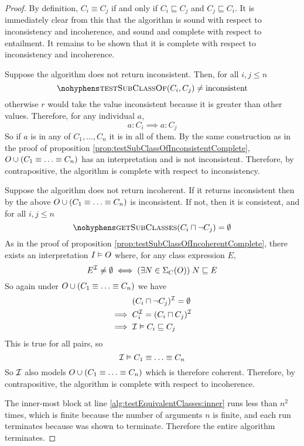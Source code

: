 \documentclass[paper.tex]{subfiles}
\begin{document}
\begin{proof}
  By definition, $C_i \equiv C_j$ if and only if $C_i \sqsubseteq C_j$ and $C_j \sqsubseteq C_i$.  It is immediately clear from this that the algorithm is sound with respect to inconsistency and incoherence, and sound and complete with respect to entailment.  It remains to be shown that it is complete with respect to inconsistency and incoherence.

  Suppose the algorithm does not return inconsistent.  Then, for all $i,j \le n$
  \[ \textproc{testSubClassOf}(C_i, C_j) \ne \mathrm{inconsistent} \]
  otherwise $r$ would take the value inconsistent because it is greater than other values.
  Therefore, for any individual $a$,
  \[ a : C_i \implies a : C_j \]
  So if $a$ is in any of $C_1, \ldots, C_n$ it is in all of them.  By the same construction as in the proof of proposition \ref{prop:testSubClassOfInconsistentComplete}, $O \cup (C_1 \equiv \ldots \equiv C_n)$ has an interpretation and is not inconsistent.  Therefore, by contrapositive, the algorithm is complete with respect to inconsistency.

  Suppose the algorithm does not return incoherent.  If it returns inconsistent then by the above $O \cup (C_1 \equiv \ldots \equiv C_n)$ is inconsistent.  If not, then it is consistent, and for all $i,j \le n$
  \[ \textproc{getSubClasses}(C_i \sqcap \neg C_j) = \emptyset \]
  As in the proof of proposition \ref{prop:testSubClassOfIncoherentComplete}, there exists an interpretation $I \vDash O$ where, for any class expression $E$,
  \[ E^{\mathcal{I}} \ne \emptyset \iff (\exists N \in \Sigma_C(O)) \; N \sqsubseteq E \]
  So again under $O \cup (C_1 \equiv \ldots \equiv C_n)$ we have
  \begin{align*}
    & (C_i \sqcap \neg C_j)^{\mathcal{I}} = \emptyset \\
    \implies{}& C_i^{\mathcal{I}} = (C_i \sqcap C_j)^{\mathcal{I}} \\
    \implies{}& \mathcal{I} \vDash C_i \sqsubseteq C_j
  \end{align*}
  This is true for all pairs, so
  \[ \mathcal{I} \vDash C_1 \equiv \ldots \equiv C_n \]
  So $\mathcal{I}$ also models $O \cup (C_1 \equiv \ldots \equiv C_n)$ which is therefore coherent.  Therefore, by contrapositive, the algorithm is complete with respect to incoherence.

  The inner-most block at line \ref{alg:testEquivalentClasses:inner} runs less than $n^2$ times, which is finite because the number of arguments $n$ is finite, and each run terminates because  was shown to terminate.  Therefore the entire algorithm terminates.
\end{proof}
\end{document}
